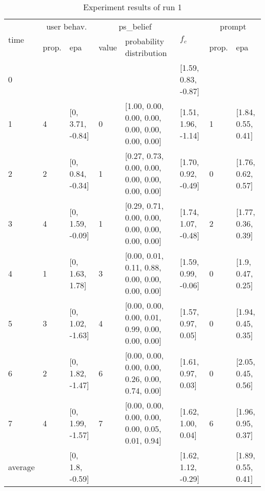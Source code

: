 \begin{table}[htbp]\footnotesize
\caption{Experiment results of run 1}
\begin{tabular}{|p{0.4cm}|p{0.6cm}|l|p{0.6cm}|p{3.3cm}|l|p{0.6cm}|l|}
\hline

\multirow{2}{*}{time} & \multicolumn{2}{c|}{user behav.} & \multicolumn{2}{c|}{ps\_belief} &
\multirow{2}{*}{$f_c$} & \multicolumn{2}{c|}{prompt} \\ \cline{2-5}\cline{ 7- 8}
& prop. & epa & value & probability distribution &  & prop. & epa \\ \hline

0 & \multicolumn{ 1}{l|}{} &  & \multicolumn{1}{l|}{} &  & [1.59, 0.83, -0.87] & \multicolumn{ 1}{l|}{} &  \\ \hline
1 & 4 & [0, 3.71, -0.84] & 0 & [1.00, 0.00, 0.00, 0.00, 0.00, 0.00, 0.00, 0.00] & [1.51, 1.96, -1.14] & 1 & [1.84, 0.55, 0.41] \\ \hline
2 & 2 & [0, 0.84, -0.34] & 1 & [0.27, 0.73, 0.00, 0.00, 0.00, 0.00, 0.00, 0.00] & [1.70, 0.92, -0.49] & 0 & [1.76, 0.62, 0.57] \\ \hline
3 & 4 & [0, 1.59, -0.09] & 1 & [0.29, 0.71, 0.00, 0.00, 0.00, 0.00, 0.00, 0.00] & [1.74, 1.07, -0.48] & 2 & [1.77, 0.36, 0.39] \\ \hline
4 & 1 & [0, 1.63, 1.78] & 3 & [0.00, 0.01, 0.11, 0.88, 0.00, 0.00, 0.00, 0.00] & [1.59, 0.99, -0.06] & 0 & [1.9, 0.47, 0.25] \\ \hline
5 & 3 & [0, 1.02, -1.63] & 4 & [0.00, 0.00, 0.00, 0.01, 0.99, 0.00, 0.00, 0.00] & [1.57, 0.97, 0.05] & 0 & [1.94, 0.45, 0.35] \\ \hline
6 & 2 & [0, 1.82, -1.47] & 6 & [0.00, 0.00, 0.00, 0.00, 0.26, 0.00, 0.74, 0.00] & [1.61, 0.97, 0.03] & 0 & [2.05, 0.45, 0.56] \\ \hline
7 & 4 & [0, 1.99, -1.57] & 7 & [0.00, 0.00, 0.00, 0.00, 0.00, 0.05, 0.01, 0.94] & [1.62, 1.00, 0.04] & 6 & [1.96, 0.95, 0.37] \\ \hline
\multicolumn{1}{|l|}{average} & \multicolumn{1}{l|}{} & [0, 1.8, -0.59] & \multicolumn{1}{l|}{} &  & [1.62, 1.12, -0.29] & \multicolumn{1}{l|}{} & [1.89, 0.55, 0.41] \\ \hline
\end{tabular}
\label{}
\end{table}


